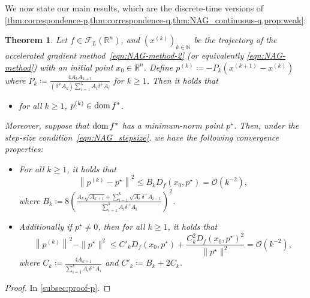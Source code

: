 \documentclass[11pt,a4paper]{article}
\theoremstyle{definition}
\theoremstyle{plain}
\newtheorem{thm}{Theorem}[section]
\newcommand{\RR}{{\mathbb{R}}}
\newcommand{\NN}{{\mathbb{N}}}
\newcommand{\dom}{\mathop{\rm dom}}
\begin{document}
We now state our main results, which are the discrete-time versions of \cref{thm:correspondence-p,thm:correspondence-q,thm:NAG_continuous-q,prop:weak}:
\begin{thm}
    \label{thm:NAG_discrete}
    Let $f \in \mathcal{F}_L(\RR^n)$, and $\left(x^{(k)}\right)_{k \in \NN}$ be the trajectory of the accelerated gradient method~\eqref{eqn:NAG-method-2} (or equivalently \eqref{eqn:NAG-method}) with an initial point $x_0 \in \RR^n$.
    Define $p^{(k)} \coloneqq -P_k\left(x^{(k + 1)} - x^{(k)}\right)$ where $P_k \coloneqq \frac{4A_kA_{k + 1}}{(\delta^+A_k)\sum_{i = 1}^{k}A_i\delta^+A_i}$ for $k \ge 1$.
    Then it holds that
    \begin{itemize}
        \item[(a)] for all $k \ge 1$, $p^{(k)} \in \dom f^\ast$.
    \end{itemize}
    Moreover, suppose that $\dom f^\ast$ has a minimum-norm point $p^\star$.
    Then, under the step-size condition~\eqref{eqn:NAG_stepsize}, we have the following convergence properties:
    \begin{itemize}
        \item[(b)] For all $k \ge 1$, it holds that 
        \[
            \left\|p^{(k)} - p^\star\right\|^2 \le B_kD_f(x_0, p^\star) = \mathcal{O}(k^{-2}),
        \]
        where $B_k \coloneqq 8\left(\frac{A_k\sqrt{A_{k + 1}} + \sum_{i = 1}^k\sqrt{A_i}\delta^+A_{i - 1}}{\sum_{i = 1}^kA_i\delta^+A_i}\right)^2$.
        \item[(c)] Additionally if $p^\star \neq 0$, then for all $k \ge 1$, it holds that
        \[
            \left\|p^{(k)}\right\|^2 - \|p^\star\|^2 \le C'_kD_f(x_0, p^\star) + \frac{C_k^2D_f(x_0, p^\star)^2}{\|p^\star\|^2} = \mathcal{O}(k^{-2}),
        \]
        where $C_k \coloneqq \frac{4A_{k + 1}}{\sum_{i = 1}^kA_i\delta^+A_i}$ and $C'_k \coloneqq B_k + 2C_k$.
    \end{itemize}
\end{thm}
\begin{proof}
    In \cref{subsec:proof-p}.
\end{proof}
\end{document}
